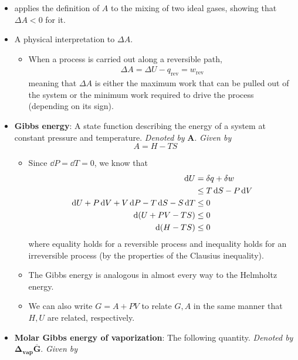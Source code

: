 \documentclass[../notes.tex]{subfiles}
\begin{document}
\begin{itemize}
\begin{itemize}
    \end{itemize}
    \item \textcite{bib:McQuarrieSimon} applies the definition of $A$ to the mixing of two ideal gases, showing that $\Delta A<0$ for it.
    \item A physical interpretation to $\Delta A$.
    \begin{itemize}
        \item When a process is carried out along a reversible path,
        \begin{align*}
            \Delta A = \Delta U-q_\text{rev} = w_\text{rev}
        \end{align*}
        meaning that $\Delta A$ is either the maximum work that can be pulled out of the system or the minimum work required to drive the process (depending on its sign).
    \end{itemize}
    \item \textbf{Gibbs energy}: A state function describing the energy of a system at constant pressure and temperature. \emph{Denoted by} $\bm{A}$. \emph{Given by}
    \begin{equation*}
        A = H-TS
    \end{equation*}
    \begin{itemize}
        \item Since $\dd{P}=\dd{T}=0$, we know that
        \begin{align*}
            \dd{U} &= \var{q}+\var{w}\\
            &\leq T\dd{S}-P\dd{V}\\
            \dd{U}+P\dd{V}+V\dd{P}-T\dd{S}-S\dd{T} &\leq 0\\
            \dd{(U+PV-TS)} &\leq 0\\
            \dd{(H-TS)} &\leq 0
        \end{align*}
        where equality holds for a reversible process and inequality holds for an irreversible process (by the properties of the Clausius inequality).
        \item The Gibbs energy is analogous in almost every way to the Helmholtz energy.
        \item We can also write $G=A+PV$ to relate $G,A$ in the same manner that $H,U$ are related, respectively.
    \end{itemize}
    \item \textbf{Molar Gibbs energy of vaporization}: The following quantity. \emph{Denoted by} $\bm{\Delta_\textbf{vap}\overline{G}}$. \emph{Given by}
    \begin{equation*}

\end{equation*}
\end{itemize}
\end{document}
